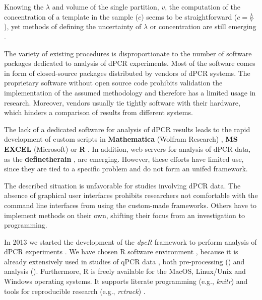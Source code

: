\documentclass[a4,center,fleqn]{NAR}
\begin{document}
Knowing the $\lambda$ and volume of the single partition, $v$, the computation 
of the concentration of a template in the sample ($c$) seems to be 
straightforward ($ c = \frac{\lambda}{V} $), yet methods of defining the 
uncertainty of $\lambda$ or concentration are still emerging 
\cite{dorazio_statistical_2015}.

The variety of existing procedures is disproportionate to the number of 
software packages dedicated to analysis of dPCR experiments. Most of the 
software comes in form of closed-source packages distributed by vendors of dPCR 
systems. The proprietary software without open source code prohibits validation 
the implementation of the assumed methodology and therefore has a limited usage 
in research. Moreover, vendors usually tie tightly software with their 
hardware, which hinders a comparison of results from different systems.

The lack of a dedicated software for analysis of dPCR results leads to the rapid 
development of custom scripts in \textbf{Mathematica} (Wolfram Research) 
\cite{strain_highly_2013}, \textbf{MS EXCEL} (Microsoft) 
\cite{dobnik_multiplex_2015} or \textbf{R} \cite{trypsteen_ddpcrquant_2015, 
dreo_optimising_2014}. In addition, web-servers for analysis of dPCR data, as 
the \textbf{definetherain} \cite{jones_low_2014}, are emerging. However, these 
efforts have limited use, since they are tied to a specific problem and do not 
form an unifed framework.

The described situation is unfavorable for studies involving dPCR data. The 
absence of graphical user interfaces prohibits researchers not comfortable with 
the command line interfaces from using the custom-made frameworks. Others have 
to implement methods on their own, shifting their focus from an investigation to 
programming. 

In 2013 we started the development of the \textit{dpcR} framework to perform 
analysis of dPCR experiments \cite{burdukiewicz_dpcr:_2013}. We have chosen R 
software environment \cite{Rcitation}, because it is already extensively used 
in studies of qPCR data \cite{pabinger_survey_2014, rodiger_r_2015}, both 
pre-processing (\cite{roediger2015chippcr, perkins_readqpcr_2012}) and 
analysis (\cite{rodiger_surface_2013, ritz_qpcr_2008}). Furthermore, R is 
freely available for the MacOS, Linux/Unix and Windows operating systems. It 
supports literate programming (e.g., \textit{knitr}) and tools for reproducible 
research (e.g., \textit{rctrack}) \cite{liu_r_2014}. 
\end{document}
